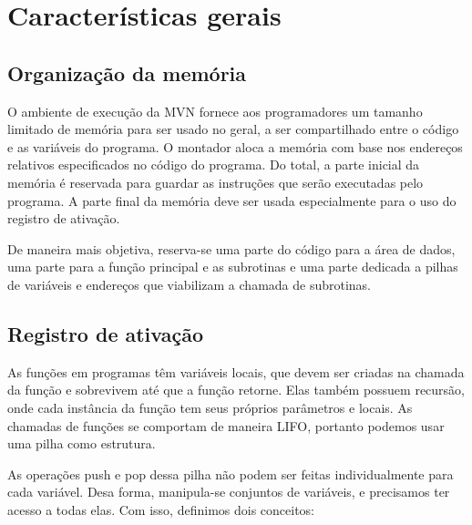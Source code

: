 
\section{Características gerais}

\subsection{Organização da memória}

O ambiente de execução da MVN fornece aos programadores um tamanho limitado de memória para ser usado no geral, a ser compartilhado entre o código e as variáveis do programa. O montador aloca a memória com base nos endereços relativos especificados no código do programa. Do total, a parte inicial da memória é reservada para guardar as instruções que serão executadas pelo programa. A parte final da memória deve ser usada especialmente para o uso do registro de ativação.

De maneira mais objetiva, reserva-se uma parte do código para a área de dados, uma parte para a função principal e as subrotinas e uma parte dedicada a pilhas de variáveis e endereços que viabilizam a chamada de subrotinas.

\subsection{Registro de ativação}

As funções em programas têm variáveis locais, que devem ser criadas na chamada da função e sobrevivem até que a função retorne. Elas também possuem recursão, onde cada instância da função tem seus próprios parâmetros e locais. As chamadas de funções se comportam de maneira LIFO, portanto podemos usar uma pilha como estrutura.

As operações push e pop dessa pilha não podem ser feitas individualmente para cada variável. Desa forma, manipula-se conjuntos de variáveis, e precisamos ter acesso a todas elas. Com isso, definimos dois conceitos:

